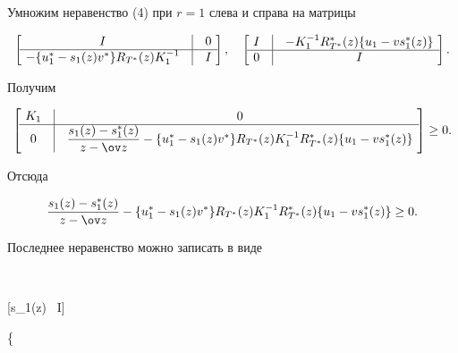 \begin{pf}


Умножим неравенство (4) при $r=1$ слева и справа на матрицы


$$


\left[\ \begin{matrix}


I & \vline & 0 \\


\hline


- \{u_1^*-s_1(z)v^*\}R_{T^*}(z)K_1^{-1} & \vline & I


\end{matrix}\ \right]


,\quad


\left[\ \begin{matrix}


I & \vline & -K_1^{-1}R_{T^*}^*(z) \{u_1-vs_1^*(z)\} \\


\hline


0 & \vline & I


\end{matrix}\ \right]


.


$$


Получим


$$


\left[\ \begin{matrix}


K_1 & \vline & 0 \\


\hline


0 & \vline & \dfrac {s_1(z)-s_1^*(z)}{z-\ov z}-\{ u_1^*-


s_1(z)v^*\}R_{T^*}(z)K_1^{-1}R_{T^*}^*(z)\{u_1-vs_1^*(z)\}


\end{matrix}\ \right]\geq 0.


$$


Отсюда


$$


\frac {s_1(z)-s_1^*(z)}{z-\ov z}-


\{u_1^*-s_1(z)v^* \}R_{T^*}(z)K_1^{-1}R_{T^*}^*(z)\{u_1-vs_1^*(z)\}


\geq 0.


$$


Последнее неравенство можно записать в виде


$$


[s_1(z) \, I]


\bigg\{



\end{pf}
